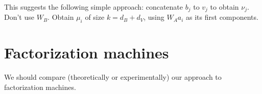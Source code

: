 \documentclass[french, english]{da2pl2018}
\begin{document}
This suggests the following simple approach: concatenate $b_j$ to $v_j$ to obtain $\nu_j$. Don’t use $W_B$. Obtain $\mu_i$ of size $k = d_B + d_V$, using $W_A a_i$ as its first components.

\section{Factorization machines}
We should compare (theoretically or experimentally) our approach to factorization machines.
\end{document}
